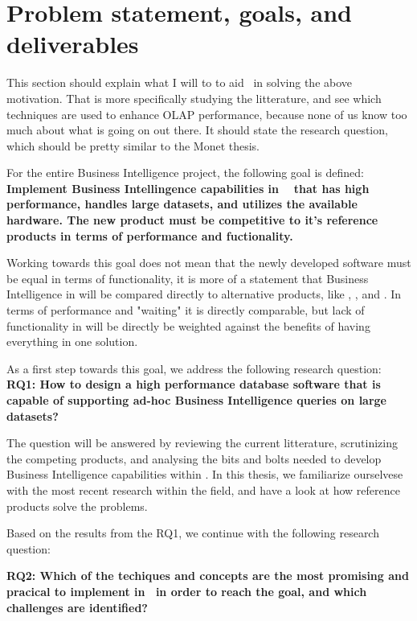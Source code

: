 \section{Problem statement, goals, and deliverables}
\label{sec:problem-statement-and-goals}
\begin{secex}
This section should explain what I will to to aid \genus~in solving the above motivation. That is more specifically studying the litterature, and see which techniques are used to enhance OLAP performance, because none of us know too much about what is going on out there. It should state the research question, which should be pretty similar to the Monet thesis.
\end{secex}

For the entire Business Intelligence project, the following goal is defined:
\textbf{Implement Business Intellingence capabilities in \genusSoftware~ that has high performance, handles large datasets, and utilizes the available hardware. The new product must be competitive to it's reference products in terms of performance and fuctionality.}

Working towards this goal does not mean that the newly developed software must be equal in terms of functionality, it is more of a statement that Business Intelligence in \genusSoftware will be compared directly to alternative products, like \qlikview, \tableau, and \powerpivot. In terms of performance and "waiting" it is directly comparable, but lack of functionality in \genusSoftware will be directly be weighted against the benefits of having everything in one solution.

As a first step towards this goal, we address the following research question:
\textbf{RQ1: How to design a high performance database software that is capable of supporting ad-hoc Business Intelligence queries on large datasets?}

The question will be answered by reviewing the current litterature, scrutinizing the competing products, and analysing the bits and bolts needed to develop Business Intelligence capabilities within \genusSoftware. In this thesis, we familiarize ourselvese with the most recent research within the field, and have a look at how reference products solve the problems. 

Based on the results from the RQ1, we continue with the following research question:

\textbf{RQ2: Which of the techiques and concepts are the most promising and pracical to implement in \genusSoftware~in order to reach the goal, and which challenges are identified?}

